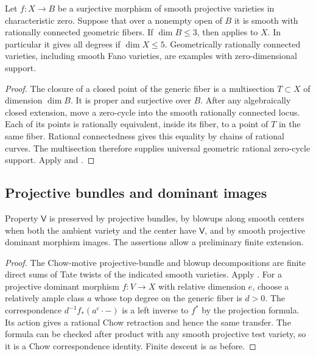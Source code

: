 \begin{corollary}\label{cor:rc-fibrations}
Let $f:X\to B$ be a surjective morphism of smooth projective varieties
in characteristic zero. Suppose that over a nonempty open of $B$ it
is smooth with rationally connected geometric fibers. If $\dim B\leq3$,
then  applies to $X$. In particular it gives
all degrees if $\dim X\leq5$. Geometrically rationally connected
varieties, including smooth Fano varieties, are examples with
zero-dimensional support.
\end{corollary}

\begin{proof}
The closure of a closed point of the generic fiber is a multisection
$T\subset X$ of dimension $\dim B$. It is proper and surjective over
$B$. After any algebraically closed extension, move a zero-cycle
into the smooth rationally connected locus. Each of its points is
rationally equivalent, inside its fiber, to a point of $T$ in the
same fiber. Rational connectedness gives this equality by chains of
rational curves. The multisection therefore supplies universal
geometric rational zero-cycle support. Apply
 and .
\end{proof}

\subsection{Projective bundles and dominant images}

\begin{proposition}\label{prop:closures}
Property $\mathsf V$ is preserved by projective bundles, by blowups
along smooth centers when both the ambient variety and the center
have $\mathsf V$, and by smooth projective dominant morphism images.
The assertions allow a preliminary finite extension.
\end{proposition}

\begin{proof}
The Chow-motive projective-bundle and blowup decompositions are
finite direct sums of Tate twists of the indicated smooth varieties.
Apply . For a projective dominant
morphism $f:V\to X$ with relative dimension $e$, choose a relatively
ample class $a$ whose top degree on the generic fiber is $d>0$.
The correspondence $d^{-1}f_*(a^e\cdot-)$ is a left inverse to
$f^*$ by the projection formula. Its action gives a rational Chow
retraction and hence the same transfer. The formula can be checked
after product with any smooth projective test variety, so it is a
Chow correspondence identity. Finite descent is as before.
\end{proof}


